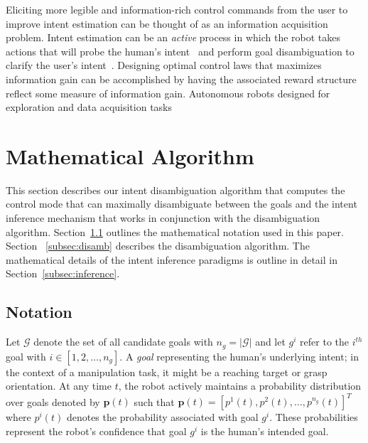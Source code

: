 Eliciting more legible and information-rich control commands from the user to improve intent estimation can be thought of as an information acquisition problem. Intent estimation can be an \textit{active} process in which the robot takes actions that will probe the human's intent~\cite{sadigh2016information, sadigh2016planning} and perform goal disambiguation to clarify the user's intent~\cite{gopinath2017mode}. Designing optimal control laws that maximizes information gain can be accomplished by having the associated reward structure reflect some measure of information gain. 
Autonomous robots designed for exploration and data acquisition tasks  

\section{Mathematical Algorithm}\label{sec:ma}
This section describes our intent disambiguation algorithm that computes the control mode that can maximally disambiguate between the goals and the intent inference mechanism that works in conjunction with the disambiguation algorithm. Section~\ref{subsec:notation} outlines the mathematical notation used in this paper. Section ~\ref{subsec:disamb} describes the disambiguation algorithm. The mathematical details of the intent inference paradigms is outline in detail in Section~\ref{subsec:inference}.
\subsection{Notation}\label{subsec:notation}
Let $\mathcal{G}$ denote the set of all candidate goals with $n_g = \vert\mathcal{G}\vert$ and let $g^i$ refer to the $i^{th}$ goal with $i \in [1,2,\dots, n_g]$. A \textit{goal} representing the human's underlying intent; in the context of a manipulation task, it might be a reaching target or grasp orientation. At any time $t$, the robot actively maintains a probability distribution over goals denoted by $\boldsymbol{p}(t)$ such that $\boldsymbol{p}(t) = [p^1(t), p^2(t),\dots, p^{n_g}(t)]^{T}$ where $p^i(t)$ denotes the probability associated with goal $g^i$.  These probabilities represent the robot's confidence that goal $g^i$ is the human's intended goal. 

